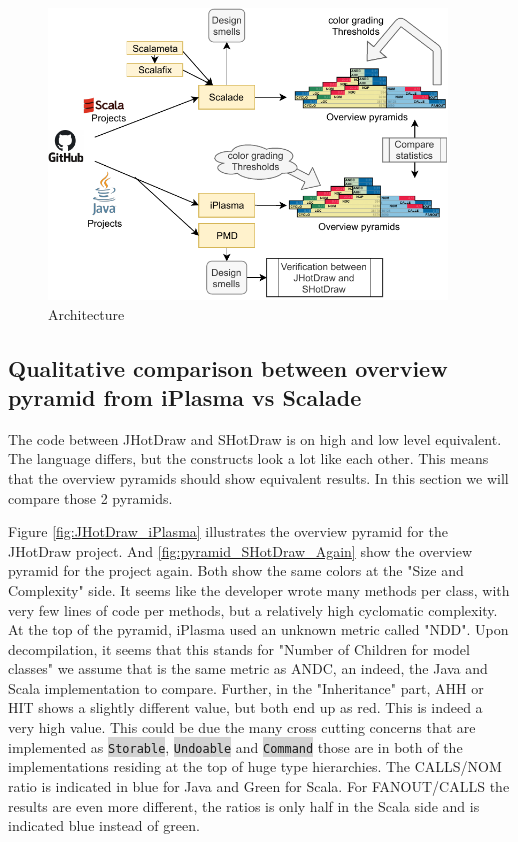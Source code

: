 \documentclass[onecolumn]{article}
\newcommand{\code}[1]{\colorbox{lightgray}{\texttt{#1}}}
\begin{document}
\begin{figure}[H]
  \centering
  \includegraphics[width=300pt]{fig/architecture-overview.pdf}
  \caption{Architecture}
  \label{fig:architecture-overview}
\end{figure}





\subsection{Qualitative comparison between overview pyramid from iPlasma vs Scalade} \label{section_compare_pyramids}
The code between JHotDraw and SHotDraw is on high and low level equivalent. The language differs, but the constructs look a lot like each other. This means that the overview pyramids should show equivalent results. In this section we will compare those 2 pyramids. 

Figure \ref{fig:JHotDraw_iPlasma} illustrates the overview pyramid for the JHotDraw project. And \ref{fig:pyramid_SHotDraw_Again} show the overview pyramid for the project again. Both show the same colors at the "Size and Complexity" side. It seems like the developer wrote many methods per class, with very few lines of code per methods, but a relatively high cyclomatic complexity. At the top of the pyramid, iPlasma used an unknown metric called "NDD". Upon decompilation, it seems that this stands for "Number of Children for model classes" we assume that is the same metric as ANDC, an indeed, the Java and Scala implementation to compare. Further, in the "Inheritance" part, AHH or HIT shows a slightly different value, but both end up as red. This is indeed a very high value. This could be due the many cross cutting concerns that are implemented as \code{Storable}, \code{Undoable} and \code{Command} those are in both of the implementations residing at the top of huge type hierarchies. The CALLS/NOM ratio is indicated in blue for Java and Green for Scala. For FANOUT/CALLS the results are even more different, the ratios is only half in the Scala side and is indicated blue instead of green.
\end{document}
